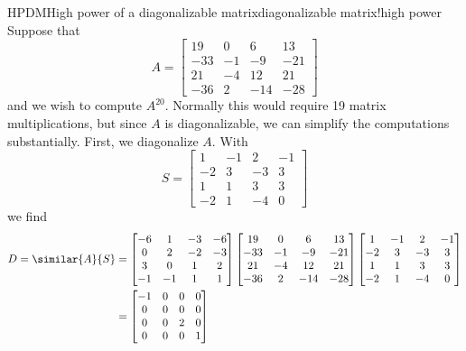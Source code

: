 \begin{example}{HPDM}{High power of a diagonalizable matrix}{diagonalizable matrix!high power}
%
Suppose that 
%
\begin{equation*}
A=\begin{bmatrix}
 19 & 0 & 6 & 13 \\
 -33 & -1 & -9 & -21 \\
 21 & -4 & 12 & 21 \\
 -36 & 2 & -14 & -28
\end{bmatrix}
\end{equation*}
%
and we wish to compute $A^{20}$.  Normally this would require 19 matrix multiplications, but since $A$ is diagonalizable, we can simplify the computations substantially.  First, we diagonalize $A$.  With
%
\begin{equation*}
S=\begin{bmatrix}
 1 & -1 & 2 & -1 \\
 -2 & 3 & -3 & 3 \\
 1 & 1 & 3 & 3 \\
 -2 & 1 & -4 & 0
\end{bmatrix}
\end{equation*}
%
we find
%
%
\begin{align*}
%
D=\similar{A}{S}
&=
\begin{bmatrix}
 -6 & 1 & -3 & -6 \\
 0 & 2 & -2 & -3 \\
 3 & 0 & 1 & 2 \\
 -1 & -1 & 1 & 1
\end{bmatrix}
\begin{bmatrix}
 19 & 0 & 6 & 13 \\
 -33 & -1 & -9 & -21 \\
 21 & -4 & 12 & 21 \\
 -36 & 2 & -14 & -28
\end{bmatrix}
\begin{bmatrix}
 1 & -1 & 2 & -1 \\
 -2 & 3 & -3 & 3 \\
 1 & 1 & 3 & 3 \\
 -2 & 1 & -4 & 0
\end{bmatrix}\\
%
&=
\begin{bmatrix}
 -1 & 0 & 0 & 0 \\
 0 & 0 & 0 & 0 \\
 0 & 0 & 2 & 0 \\
 0 & 0 & 0 & 1
\end{bmatrix}
%
\end{align*}

\end{example}
